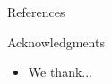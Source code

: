 \documentclass[final,hyperref={pdfpagelabels=false}]{beamer}
\begin{document}
\begin{frame}[t]
\begin{columns}[t]
\begin{column}{.23\textwidth}
\begin{block}{References}
        
\small{
} 

\end{block}


\begin{block}{Acknowledgments}
\begin{itemize}
\small 
\item We thank...
\end{itemize}
\end{block}






\end{column} %


\end{columns} %

\end{frame} %
\end{document}
